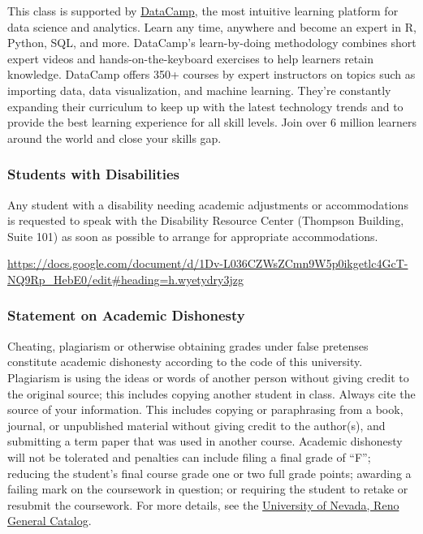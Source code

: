 \documentclass[
]{article}
\begin{document}
This class is supported by \href{https://www.datacamp.com/}{DataCamp},
the most intuitive learning platform for data science and analytics.
Learn any time, anywhere and become an expert in R, Python, SQL, and
more. DataCamp's learn-by-doing methodology combines short expert videos
and hands-on-the-keyboard exercises to help learners retain knowledge.
DataCamp offers 350+ courses by expert instructors on topics such as
importing data, data visualization, and machine learning. They're
constantly expanding their curriculum to keep up with the latest
technology trends and to provide the best learning experience for all
skill levels. Join over 6 million learners around the world and close
your skills gap.

\hypertarget{students-with-disabilities}{%
\subsubsection{Students with
Disabilities}\label{students-with-disabilities}}

Any student with a disability needing academic adjustments or
accommodations is requested to speak with the Disability Resource Center
(Thompson Building, Suite 101) as soon as possible to arrange for
appropriate accommodations.

\url{https://docs.google.com/document/d/1Dv-L036CZWsZCmn9W5p0ikgetlc4GcT-NQ9Rp_HebE0/edit\#heading=h.wyetydry3jzg}

\hypertarget{statement-on-academic-dishonesty}{%
\subsubsection{Statement on Academic
Dishonesty}\label{statement-on-academic-dishonesty}}

Cheating, plagiarism or otherwise obtaining grades under false pretenses
constitute academic dishonesty according to the code of this university.
Plagiarism is using the ideas or words of another person without giving
credit to the original source; this includes copying another student in
class. Always cite the source of your information. This includes copying
or paraphrasing from a book, journal, or unpublished material without
giving credit to the author(s), and submitting a term paper that was
used in another course. Academic dishonesty will not be tolerated and
penalties can include filing a final grade of ``F''; reducing the
student's final course grade one or two full grade points; awarding a
failing mark on the coursework in question; or requiring the student to
retake or resubmit the coursework. For more details, see the
\href{http://catalog.unr.edu/}{University of Nevada, Reno General
Catalog}.
\end{document}

